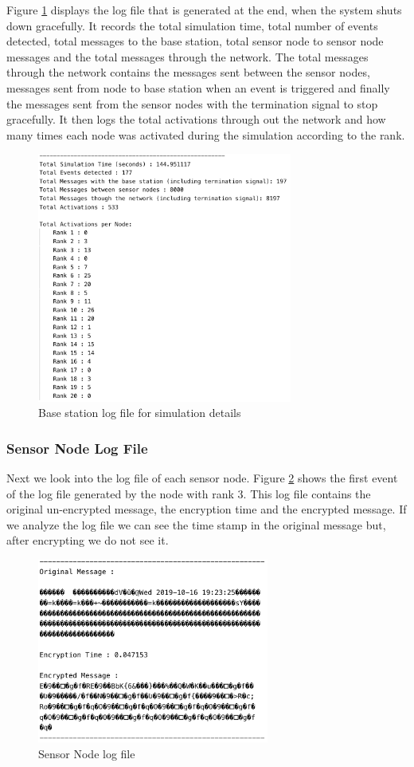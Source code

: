\documentclass[conference]{IEEEtran}
\begin{document}
	Figure \ref{lst:log2} displays the log file that is generated at the end, when the system shuts down gracefully. It records the total simulation time, total number of events detected, total messages to the base station, total sensor node to sensor node messages and the total messages through the network. The total messages through the network contains the messages sent between the sensor nodes, messages sent from node to base station when an event is triggered and finally the messages sent from the  sensor nodes with the termination signal to stop gracefully. It then logs the total activations through out the network and how many times each node was activated during the simulation  according to the rank. 
	
	\begin{figure}[!h]
		\centering
		\includegraphics[width=3.3in,keepaspectratio]{logS}
		\caption{Base station log file for simulation details}
		\label{lst:log2}
	\end{figure}	
	
	\subsubsection{Sensor Node Log File}
	
	Next we look into the log file of each sensor node. Figure \ref{Message} shows the first event of the log file generated by the node with rank 3. This log file contains the original un-encrypted message, the encryption time and the encrypted message. If we analyze the log file we can see the time stamp in the original message but, after encrypting we do not see it.
	
	\begin{figure}[!h]
		\centering
		\includegraphics[width=3in,keepaspectratio]{en}
		\caption{Sensor Node log file}
		\label{Message}
	\end{figure}
\end{document}
